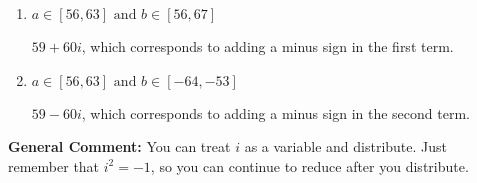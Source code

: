 \documentclass{extbook}[14pt]
\begin{document}
\begin{enumerate}
{\begin{enumerate}[label=\Alph*.]
* $5 - 84 i$, which is the correct option.
\item \( a \in [56, 63] \text{ and } b \in [56, 67] \)

 $59 + 60 i$, which corresponds to adding a minus sign in the first term.
\item \( a \in [56, 63] \text{ and } b \in [-64, -53] \)

 $59 - 60 i$, which corresponds to adding a minus sign in the second term.
\end{enumerate}

\textbf{General Comment:} You can treat $i$ as a variable and distribute. Just remember that $i^2=-1$, so you can continue to reduce after you distribute.
}
\end{enumerate}
\end{document}
